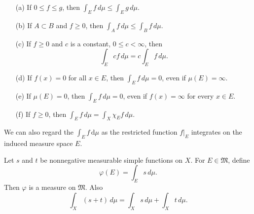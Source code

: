 \documentclass[../main.tex]{subfiles}
\begin{document}
\begin{corollary}{}{}
    \begin{enumerate}
    \item[(a)] If $0 \le f \le g$, then $\int_E f \, d\mu \le \int_E g \, d\mu$.
    \item[(b)] If $A \subset B$ and $f \ge 0$, then $\int_A f \, d\mu \le \int_B f \, d\mu$.
    \item[(c)] If $f \ge 0$ and $c$ is a constant, $0 \le c < \infty$, then
    \[
    \int_E cf \, d\mu = c \int_E f \, d\mu.
    \]
    \item[(d)] If $f(x) = 0$ for all $x \in E$, then $\int_E f \, d\mu = 0$, even if $\mu(E) = \infty$.
    \item[(e)] If $\mu(E) = 0$, then $\int_E f \, d\mu = 0$, even if $f(x) = \infty$ for every $x \in E$.
    \item[(f)] If $f \ge 0$, then $\int_E f \, d\mu = \int_X \chi_E f \, d\mu$.
\end{enumerate}
\end{corollary}

\begin{remark}
    We can also regard the \(  \int_{E} f \,\mathrm{d} \mu   \) as the restricted function \(  f|_{E}  \)  integrates on the induced measure space  \(  E  \). 
\end{remark}


\begin{proposition}{}{}
Let $s$ and $t$ be nonnegative measurable simple functions on $X$. For $E \in \mathfrak{M}$, define
\[
\varphi(E) = \int_E s \, d\mu.
\]
Then $\varphi$ is a measure on $\mathfrak{M}$. Also
\[
\int_X (s + t) \, d\mu = \int_X s \, d\mu + \int_X t \, d\mu.
\]
\end{proposition}
\end{document}
